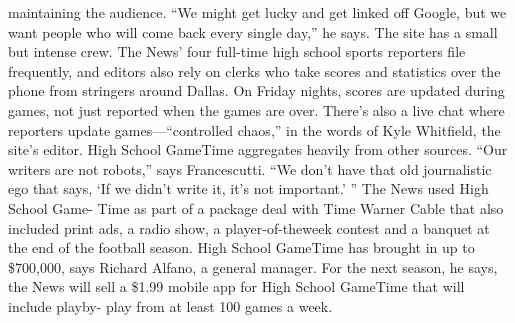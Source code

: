 maintaining the audience. ``We might get lucky and get linked off Google, but
we want people who will come back every single day,'' he says.
The site has a small but intense crew. The News’ four full-time high school
sports reporters file frequently, and editors also rely on clerks who take scores
and statistics over the phone from stringers around Dallas. On Friday nights,
scores are updated during games, not just reported when the games are over.
There’s also a live chat where reporters
update games—``controlled chaos,'' in
the words of Kyle Whitfield, the site’s
editor. High School GameTime aggregates
heavily from other sources. ``Our
writers are not robots,'' says Francescutti.
``We don’t have that old journalistic
ego that says, ‘If we didn’t write it,
it’s not important.’ ''
The News used High School Game-
Time as part of a package deal with
Time Warner Cable that also included
print ads, a radio show, a player-of-theweek
contest and a banquet at the end
of the football season. High School GameTime has brought in up to \$700,000,
says Richard Alfano, a general manager. For the next season, he says, the News
will sell a \$1.99 mobile app for High School GameTime that will include playby-
play from at least 100 games a week.

